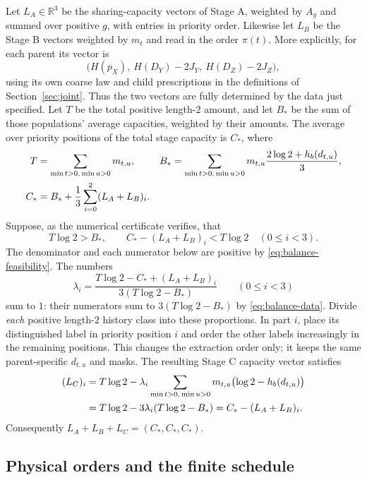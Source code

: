 Let $L_A\in\mathbb R^3$ be the sharing-capacity vectors of Stage A,
weighted by $A_g$ and summed over positive $g$, with entries in priority
order.  Likewise let $L_B$ be the Stage B vectors weighted by $m_t$
and read in the order $\pi(t)$.  More explicitly, for each parent its
vector is
\[
 \bigl(H(p_X),\ H(D_Y)-2J_Y,\ H(D_Z)-2J_Z\bigr),
\]
using its own coarse law and child prescriptions in the definitions of
Section~\ref{sec:joint}.  Thus the two vectors are fully determined
by the data just specified.  Let $T$ be the total positive length-$2$
amount, and let $B_*$ be the sum of those populations' average capacities,
weighted by their amounts.  The average over priority positions of the
total stage capacity is $C_*$, where
\begin{align}\label{eq:balance-data}
 T&=\sum_{\min t>0,\,\min u>0}m_{t,u}, &
 B_*&=\sum_{\min t>0,\,\min u>0}
       m_{t,u}\frac{2\log2+h_b(d_{t,u})}{3},\notag\\
 C_*&=B_*+\frac13\sum_{i=0}^2(L_A+L_B)_i.
\end{align}
Suppose, as the numerical certificate verifies, that
\begin{equation}\label{eq:balance-feasibility}
 T\log2>B_*,\qquad
 C_*-(L_A+L_B)_i<T\log2\quad(0\leq i<3).
\end{equation}
The denominator and each numerator below are positive by
\eqref{eq:balance-feasibility}.  The numbers
\begin{equation}\label{eq:balance-fractions}
 \lambda_i=
 \frac{T\log2-C_*+(L_A+L_B)_i}{3(T\log2-B_*)}
 \qquad(0\leq i<3)
\end{equation}
sum to $1$: their numerators sum to $3(T\log2-B_*)$ by
\eqref{eq:balance-data}.  Divide \emph{each} positive length-$2$ history class into
these proportions.  In part $i$, place its distinguished label in
priority position $i$ and order the other labels increasingly in the
remaining positions.  This changes the extraction order only; it
keeps the same parent-specific $d_{t,u}$ and masks.  The resulting
Stage C capacity vector satisfies
\begin{align}\label{eq:stage-balance}
 (L_C)_i
 &=T\log2-\lambda_i
       \sum_{\min t>0,\,\min u>0}m_{t,u}
                   \bigl(\log2-h_b(d_{t,u})\bigr)\notag\\
 &=T\log2-3\lambda_i(T\log2-B_*)
   =C_*-(L_A+L_B)_i.
\end{align}
Consequently $L_A+L_B+L_C=(C_*,C_*,C_*)$.

\subsection{Physical orders and the finite schedule}


